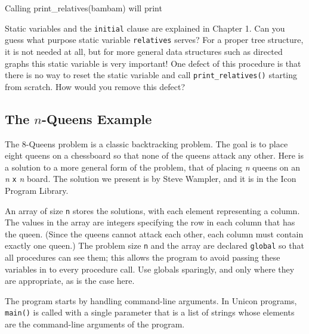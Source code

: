 Calling print\_relatives(bambam) will print


Static variables and the \texttt{initial} clause are explained in
Chapter 1. Can you guess what purpose static variable
\texttt{relatives} serves? For a proper tree structure, it is not
needed at all, but for more general data structures such as directed
graphs this static variable is very important! One defect of this
procedure is that there is no way to reset the static variable and call
\texttt{print\_relatives()} starting from scratch. How would you remove
this defect?

\subsection{The $n$-Queens Example}

The 8-Queens problem is a classic
backtracking problem. The goal is to place eight
queens on a chessboard so that none of the queens attack any other.
Here is a solution to a more general form of the problem, that of
placing \textit{n} queens on an \textit{n} \texttt{x}
\textit{n} board. The solution we present is by Steve Wampler, and it is in the Icon Program Library.

An array of size \texttt{n} stores the solutions, with each element
representing a column. The values in the array are integers specifying
the row in each column that has the queen. (Since the queens cannot
attack each other, each column must contain exactly one queen.) The
problem size \texttt{n} and the array are declared \texttt{global} so
that all procedures can see them; this allows the program to avoid
passing these variables in to every procedure call. Use globals
sparingly, and only where they are appropriate, as is the case here.


The program starts by handling command-line arguments. In Unicon
programs, \texttt{main()} is called with a single parameter that is a
list of strings whose elements are the command-line arguments of the
program.

